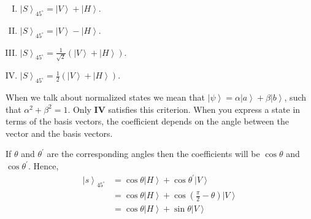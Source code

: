 \documentclass[12pt]{article}
\newcommand\half{\frac{1}{2}}
\newcommand\rr{\right \rangle}
\newcommand\ls{\left |}
\newcommand\tbf[1]{\textbf{#1}}
\begin{document}
\begin{enumerate}[1.]
 		\begin{enumerate}[I.]
 			\item $\ls S \rr _{45^\circ} = \ls V \rr + \ls H \rr$.
 			\item $\ls S \rr _{45^\circ} = \ls V \rr - \ls H \rr$.
 			\item $\ls S \rr _{45^\circ} = \frac{1}{\sqrt{2}}\left( \ls V \rr + \ls H \rr \right)$.
 			\item $\ls S \rr _{45^\circ} = \half \left( \ls V \rr + \ls H \rr \right)$. \\ \newline
 		\end{enumerate}
 		When we talk about normalized states we mean that $\ls \psi \rr = \alpha \ls a \rr + \beta \ls b \rr$, such that $\alpha^2 + \beta^2 = 1$. Only \tbf{IV} satisfies this criterion. When you express a state in terms of the basis vectors, the coefficient depends on the angle between the vector and the basis vectors. \newpage
\rule{0pt}{20ex}
 		 If $\theta$ and $\theta^{'}$ are the corresponding angles then the coefficients will be $\cos{\theta}$ and $\cos{\theta^{'}}$. Hence,
 		 $$
 		 \begin{aligned}
 		 \ls s \rr _{45^\circ} &= \cos{\theta} \ls H \rr + \cos{\theta^{'}}\ls V \rr \\
 		 &= \cos{\theta} \ls H \rr + \cos\left({\frac{\pi}{2}-\theta}\right)\ls V \rr \\
 		 &= \cos{\theta} \ls H \rr + \sin{\theta}\ls V \rr
 		 \end{aligned}
 		 $$
 		 
 		

\end{enumerate}
\end{document}
